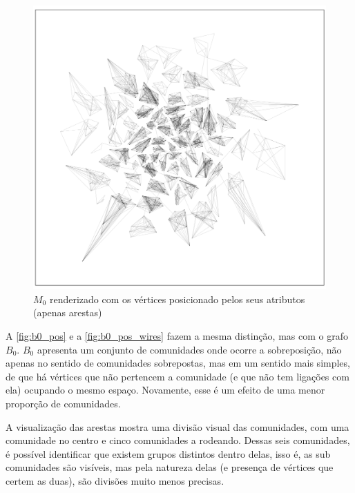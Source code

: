 \documentclass[notes.tex]{subfiles}
\begin{document}
\begin{figure}[htpb]
    \centering
    \caption{$M_0$ renderizado com os vértices posicionado pelos seus atributos (apenas arestas)}\label{fig:m0_pos_wires}
    \includegraphics[width=\textwidth, height=0.52\textheight]{figures/m0_pos_wires.png}
\end{figure}

A \autoref{fig:b0_pos} e a \autoref{fig:b0_pos_wires} fazem a mesma distinção, mas com o grafo $B_0$.
$B_0$ apresenta um conjunto de comunidades onde ocorre a sobreposição, não apenas no sentido de comunidades sobrepostas, mas em um sentido mais simples, de que há vértices que não pertencem a comunidade (e que não tem ligações com ela) ocupando o mesmo espaço.
Novamente, esse é um efeito de uma menor proporção de comunidades.

A visualização das arestas mostra uma divisão visual das comunidades, com uma comunidade no centro e cinco comunidades a rodeando.
Dessas seis comunidades, é possível identificar que existem grupos distintos dentro delas, isso é, as sub comunidades são visíveis, mas pela natureza delas (e presença de vértices que certem as duas), são divisões muito menos precisas.
\end{document}
